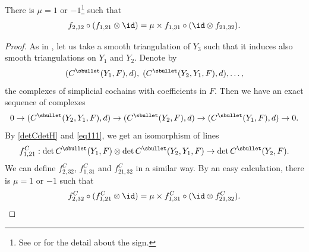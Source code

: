\begin{prop}\label{propFp}
There is $\mu=1$ or $-1$\footnote{See \cite[Rem.\,1.2]{BGS1} or
\cite{KM76} for the detail about the sign. } such that
\begin{equation}\label{mabu}
f_{2,32} \circ(f_{1,21}\otimes\id) = \mu \times
f_{1,31}\circ (\id \otimes f_{21,32}).
\end{equation}
\end{prop}
\begin{proof}
As in \cite[(0.15)]{BruningMa_2012}, let us take a smooth triangulation
of $Y_{3}$ such that it induces also smooth triangulations on
$Y_{1}$ and $Y_{2}$. Denote by
\[
(C^{\sbullet}(Y_{1},F),d),\;
(C^{\sbullet}(Y_{2},Y_{1},F),d), \ldots,
\]
the complexes of simplicial
cochains with coefficients in $F$. Then we have an exact sequence of
complexes
\begin{equation}\label{eq111}
0\to (C^{\sbullet}(Y_{2},Y_{1},F),d)\to (C^{\sbullet}(Y_{2},F),d)\to
(C^{\sbullet}(Y_{1},F),d)\to 0.
\end{equation}
By \eqref{detCdetH} and \eqref{eq111}, we get an isomorphism of lines
\begin{equation*}
f^{C}_{1,21}: \det C^{\sbullet}(Y_{1},F)\otimes \det
C^{\sbullet}(Y_{2},Y_{1},F)\to \det C^{\sbullet}(Y_{2},F).
\end{equation*}
We can define $f^{C}_{2,32}$, $f^{C}_{1,31}$ and $f^{C}_{21,32}$ in a
similar way. By an easy calculation, there is $\mu=1$ or $-1$ such that
\begin{equation}\label{mabuC}
f_{2,32}^{C} \circ(f_{1,21}^{C}\otimes\id) = \mu \times
f_{1,31}^{C}\circ (\id \otimes f_{21,32}^{C}).
\end{equation}


\end{proof}
